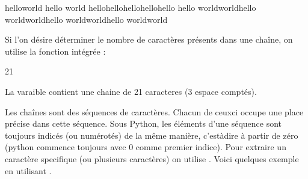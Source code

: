 \documentclass[letterpaper,10pt,french]{sphinxmanual}
\begin{document}
\begin{sphinxVerbatim}[commandchars=\\\{\}]
  
  
   
\end{sphinxVerbatim}

\begin{sphinxVerbatim}[commandchars=\\\{\}]
helloworld
hello world
hellohellohellohellohello
hello worldworldhello worldworldhello worldworldhello worldworld
\end{sphinxVerbatim}

\sphinxAtStartPar
Si l’on désire déterminer le nombre de caractères présents dans une chaîne, on utilise la fonction
intégrée  :

\begin{sphinxVerbatim}[commandchars=\\\{\}]
  
\end{sphinxVerbatim}

\begin{sphinxVerbatim}[commandchars=\\\{\}]
21
\end{sphinxVerbatim}

\sphinxAtStartPar
La varaible  contient une chaine de  21 caracteres (3 espace comptés).

\sphinxAtStartPar
Les chaînes sont des séquences de caractères. Chacun de ceux\sphinxhyphen{}ci occupe une place précise dans cette séquence. Sous Python, les éléments d’une séquence sont toujours indicés (ou numérotés) de la même manière, c’est\sphinxhyphen{}à\sphinxhyphen{}dire à partir de zéro (python commence toujours avec 0 comme premier indice). Pour extraire un caractère specifique (ou plusieurs caractères) on utilise \sphinxcode{\sphinxupquote{{[}{]}}}. Voici quelques exemple en utilisant .
\end{document}
